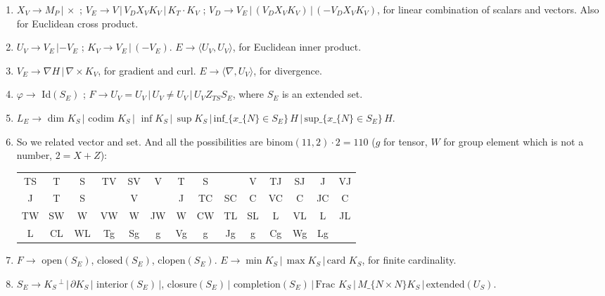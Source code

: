 \documentclass[11pt,a4paper]{article}
\newenvironment{myenum}
{ \begin{enumerate}
    \setlength{\itemsep}{0pt}
    \setlength{\parskip}{0pt}
    \setlength{\parsep}{0pt}     }
{ \end{enumerate}                  }
\begin{document}
\begin{myenum}
		\item $X_V \rightarrow M_P\,|\,\times$ ; $V_E \rightarrow V\,|\,V_D X_V K_V\,|\,K_T\cdot K_V$ ; $V_D \rightarrow V_E\,|\,(V_D X_V K_V)\,|\,(-V_D X_V K_V)$, for linear combination of scalars and vectors. Also for Euclidean cross product.
		\item $U_V \rightarrow V_E\,| -V_E$ ; $K_V \rightarrow V_E\,|\,(-V_E)$. $E \rightarrow \langle U_V, U_V \rangle$, for Euclidean inner product.
		\item $V_E \rightarrow \nabla H\,|\,\nabla \times K_V$, for gradient and curl. $E \rightarrow \langle \nabla, U_V \rangle$, for divergence.
		\item $\varphi \rightarrow$ Id$(S_E)$ ; $F \rightarrow U_V=U_V\,|\,U_V\ne U_V\,|\,U_V Z_{TS} S_E$, where $S_E$ is an extended set.
		\item $L_E \rightarrow$ dim $K_S\,|$ codim $K_S\,|$ $\inf K_S\,|\,\sup K_S\,|\,\text{inf}\_\{x\_\{N\} \in S_E\}\,H\,|\,\text{sup}\_\{x\_\{N\} \in S_E\}\,H$.
		\item So we related vector and set. And all the possibilities are binom$(11,2)\cdot 2 = 110$ ($g$ for tensor, $W$ for group element which is not a number, $2 = X + Z$):

		\begin{tabular}{C|C|C|C|C|C|C|C|C|C|C|C|C|C}
		 TS  &		 T\varphi &  S\varphi &		 TV &  SV &  \varphi V &		 T\omega &  S\omega &  \varphi\omega &  V\omega &		 TJ	&		 SJ      &  \varphi J    &  VJ      \\
		 \omega J &	 T\alpha &  S\alpha &  \varphi\alpha &  V\alpha &  \omega\alpha &  J\alpha & TC	&
		 SC      &  \varphi C     &  VC      &  \omega C     &  JC      &  \alpha C \\
		 TW	&  SW      &  \varphi W     &  VW      &  \omega W   &		 JW     &  \alpha W &  CW &  TL	&  SL      &  \varphi L     &  VL      &  \omega L    &  JL     \\
		 \alpha L &  CL &	 WL &	 Tg	&  Sg      &  \varphi g     &  Vg      &  \omega g    &  Jg     &  \alpha g &  Cg & Wg & Lg
		\end{tabular}
		\item $F \rightarrow$ open$(S_E)$, closed$(S_E)$, clopen$(S_E)$. $E \rightarrow \min K_S\,|\,\max K_S\,|\,\text{card }K_S$, for finite cardinality.
		\item $S_E \rightarrow K_S\,^\perp\,|\,\partial K_S\,|$ interior$(S_E)\,|$, closure$(S_E)\,|$  completion$(S_E)\,|\,\text{Frac }K_S\,|\,M\_\{N\times N\} K_S\,|\,\text{extended}(U_S)$.


\end{myenum}
\end{document}
